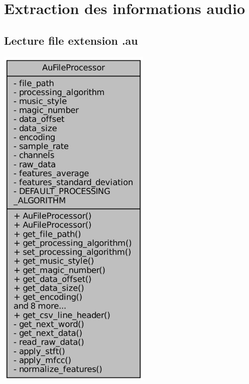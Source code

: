\documentclass[10pt]{article}
\begin{document}
\section{Extraction des informations audio}


\subsection{Lecture file extension .au}

\begin{minipage}[t]{0.4\linewidth}

\centering
\vspace{-2ex}
\includegraphics[width=0.55\textwidth]{UML-AuFIleProcess.png}

\end{minipage}
\end{document}
